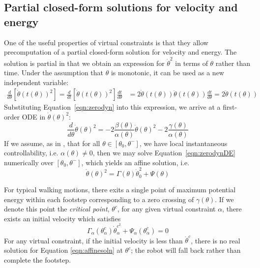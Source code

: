 \subsection{Partial closed-form solutions for velocity and energy} \label{sec:partialsol}
One of the useful properties of virtual constraints is that they allow precomputation of a partial closed-form solution for velocity and energy. The solution is partial in that we obtain an expression for $\dot{\theta}^2$ in terms of $\theta$ rather than time. Under the assumption that $\theta$ is monotonic, it can be used as a new independent variable:
\begin{align*}
	\frac{d}{d\theta}\left[\dot{\theta}\left(t(\theta)\right)^2\right] = 
	\frac{d}{dt}\left[\dot{\theta}\left(t(\theta)\right)^2\right]\frac{dt}{d\theta} &= 2\dot{\theta}(t(\theta))\ddot{\theta}(t(\theta))\frac{dt}{d\theta} = 2\ddot{\theta}\left(t(\theta)\right)
\end{align*}
Substituting Equation~\ref{eqn:zerodyn} into this expression, we arrive at a first-order ODE in $\dot{\theta}(\theta)^2$:
\begin{equation}\label{eqn:zerodynDE}
	\frac{d}{d\theta}\dot{\theta}(\theta)^2 = -2\frac{\beta(\theta)}{\alpha(\theta)}
		\dot{\theta}(\theta)^2 - 2\frac{\gamma(\theta)}{\alpha(\theta)}
\end{equation}
If we assume, as in \cite{manchester13planning}, that for all $\theta \in [\theta_0, \theta^-]$, we have local instantaneous controllability, i.e. $\alpha(\theta) \neq 0$, then we may solve Equation~\ref{eqn:zerodynDE} numerically over $[\theta_0, \theta^-]$, which yields an affine solution, i.e.
\begin{equation} \label{eqn:affinesoln}
	\dot{\theta}(\theta)^2 = \Gamma(\theta)\dot{\theta}_0^2 + \Psi(\theta)
\end{equation}

For typical walking motions, there exits a single point of maximum potential energy within each footstep corresponding to a zero crossing of $\gamma(\theta)$. If we denote this point the \textit{critical point}, $\theta^c$, for any given virtual constraint $\alpha$, there exists an initial velocity which satisfies
\begin{equation} \label{eqn:critvel}
	\Gamma_\alpha(\theta_\alpha^c)\dot{\theta}_\alpha^{c^2} + \Psi_\alpha(\theta_\alpha^c) = 0
\end{equation}
For any virtual constraint, if the initial velocity is less than $\dot{\theta}^c$, there is no real solution for Equation \ref{eqn:affinesoln} at $\theta^c$; the robot will fall back rather than complete the footstep.

